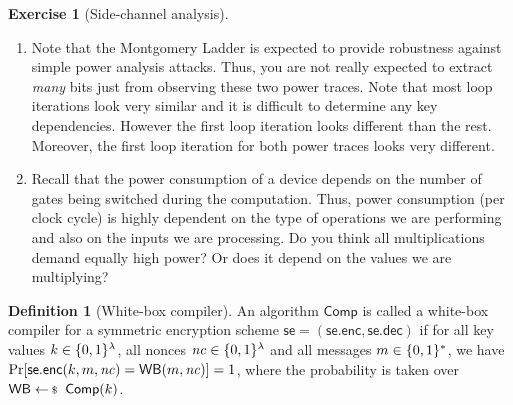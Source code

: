 \documentclass[envcountsame,runningheads,notitlepage]{../llncs}
\theoremstyle{definition}
\newtheorem{graded}[crossed]{Exercise}
\renewcommand{\O}[1]{\ensuremath{\mathsf{#1}}}
\newcommand{\pcvar}[1]{\ensuremath{\mathit{#1}}}
\newtheorem*{definition*}{Definition}
\renewcommand{\O}[1]{\ensuremath{\mathsf{#1}}}
\newcommand{\StyleModel}[1]{\O{{#1}}}
\newcommand{\WB}{\textsf{WB}}
\newcommand{\Comp}{\textsf{Comp}}
\newcommand{\se}{\StyleModel{se}}
\renewcommand{\enc}{\StyleModel{enc}}
\renewcommand{\dec}{\StyleModel{dec}}
\begin{document}
\begin{graded}[Side-channel analysis]
\begin{enumerate}
\item Note that the Montgomery Ladder is expected to provide robustness against simple power analysis attacks. Thus, you are not really expected to  extract \emph{many} bits just from observing these two power traces. Note that most loop iterations look very similar and it is difficult to determine any key dependencies. However the first loop iteration looks different than the rest. Moreover, the first loop iteration for both power traces looks very different.

\item Recall that the power consumption of a device depends on the number of gates being switched during the computation. Thus, power consumption (per clock cycle) is highly dependent on the type of operations we are performing and also on the inputs we are processing. Do you think all multiplications demand equally high power? Or does it depend on the values we are multiplying?



\end{enumerate}

\end{graded}



\begin{definition*}[White-box compiler]\label{def:wb_comp}
An algorithm $\Comp$ is called a white-box compiler for a symmetric encryption scheme $\se=(\se.\enc,\se.\dec)$ if for all key values $k \in\{0,1\}^\lambda$, all nonces $\pcvar{nc}\in\bin^\lambda$ and all messages $m\in\{0,1\}^*$, we have $\prob{\se.\enc(k,m,\pcvar{nc})=\WB(m,\pcvar{nc})} = 1$,
where the probability is taken over $\WB \sample \Comp(k)$.
\end{definition*}
\end{document}
